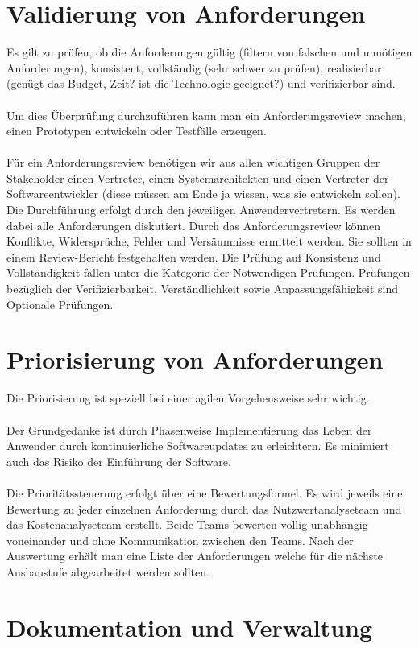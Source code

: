 \section{Validierung von Anforderungen}
Es gilt zu prüfen, ob die Anforderungen gültig (filtern von falschen und unnötigen Anforderungen), konsistent, vollständig (sehr schwer zu prüfen), realisierbar (genügt das Budget, Zeit? ist die Technologie geeignet?) und verifizierbar sind.
\\\\
Um dies Überprüfung durchzuführen kann man ein Anforderungsreview machen, einen Prototypen entwickeln oder Testfälle erzeugen.
\\\\
Für ein Anforderungsreview benötigen wir aus allen wichtigen Gruppen der Stakeholder einen Vertreter, einen Systemarchitekten und einen Vertreter der Softwareentwickler (diese müssen am Ende ja wissen, was sie entwickeln sollen). Die Durchführung erfolgt durch den jeweiligen Anwendervertretern. Es werden dabei alle Anforderungen diskutiert. Durch das Anforderungsreview können Konflikte, Widersprüche, Fehler und Versäumnisse ermittelt werden. Sie sollten in einem Review-Bericht festgehalten werden. Die Prüfung auf Konsistenz und Vollständigkeit fallen unter die Kategorie der Notwendigen Prüfungen. Prüfungen bezüglich der Verifizierbarkeit, Verständlichkeit sowie Anpassungsfähigkeit sind Optionale Prüfungen.

\section{Priorisierung von Anforderungen}
Die Priorisierung ist speziell bei einer agilen Vorgehensweise sehr wichtig. 
\\\\
Der Grundgedanke ist durch Phasenweise Implementierung das Leben der Anwender durch kontinuierliche Softwareupdates zu erleichtern. Es minimiert auch das Risiko der Einführung der Software.
\\\\
Die Prioritätssteuerung erfolgt über eine Bewertungsformel. Es wird jeweils eine Bewertung zu jeder einzelnen Anforderung durch das Nutzwertanalyseteam und das Kostenanalyseteam erstellt.  Beide Teams bewerten völlig unabhängig voneinander und ohne Kommunikation zwischen den Teams. Nach der Auswertung erhält man eine Liste der Anforderungen welche für die nächste Ausbaustufe abgearbeitet werden sollten. 

\section{Dokumentation und Verwaltung}
